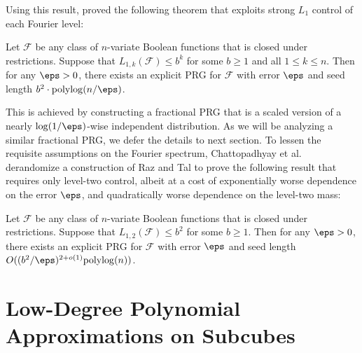 Using this result, \cite{CHHL} proved the following theorem that exploits strong $L_1$ control of each Fourier level:

\begin{THM}
\label{thm:chhl}
Let $\mathcal{F}$ be any class of $n$-variate Boolean functions that is closed under restrictions. Suppose that $L_{1,k}(\mathcal{F})\leq b^k$ for some $b\geq 1$ and all $1\leq k\leq n$. Then for any $\eps>0$, there exists an explicit PRG for $\mathcal{F}$ with error $\eps$ and seed length $b^2\cdot\mathrm{polylog}(n/\eps)$.
\end{THM}

This is achieved by constructing a fractional PRG that is a scaled version of a nearly $\log(1/\eps)$-wise independent distribution. As we will be analyzing a similar fractional PRG, we defer the details to next section. To lessen the requisite assumptions on the Fourier spectrum, Chattopadhyay {et al.} \cite{CHLT} derandomize a construction of Raz and Tal \cite{RazTal} to prove the following result that requires only level-two control, albeit at a cost of exponentially worse dependence on the error $\eps$, and quadratically worse dependence on the level-two mass:

\begin{THM}
\label{thm:chlt}
Let $\mathcal{F}$ be any class of $n$-variate Boolean functions that is closed under restrictions. Suppose that $L_{1,2}(\mathcal{F})\leq b^2$ for some $b\geq 1$. Then for any $\eps>0$, there exists an explicit PRG for $\mathcal{F}$ with error $\eps$ and seed length $O((b^2/\eps)^{2+o(1)}\mathrm{polylog}(n))$.
\end{THM}


\section{Low-Degree Polynomial Approximations on Subcubes}
\label{sec:lowdeg}

